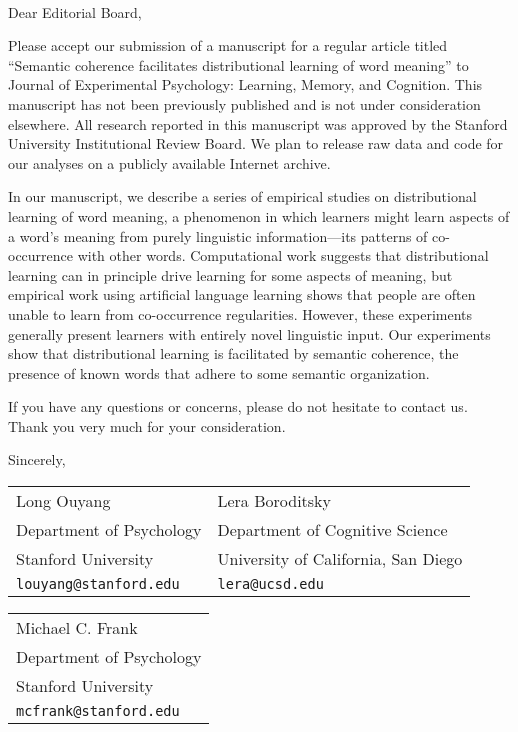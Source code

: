 \documentclass{letter}
\begin{document}
\address{450 Serra Mall \\ Building 420 (Jordan Hall) \\ Stanford, CA~~94305}


\pagestyle{empty}
\begin{letter}{~~~}
\opening{Dear Editorial Board,}

Please accept our submission of a manuscript for a regular article titled ``Semantic coherence facilitates distributional learning of word meaning'' to Journal of Experimental Psychology: Learning, Memory, and Cognition. This manuscript has not been previously published and is not under consideration elsewhere. All research reported in this manuscript was approved by the Stanford University Institutional Review Board. We plan to release raw data and code for our analyses on a publicly available Internet archive.

In our manuscript, we describe a series of empirical studies on distributional learning of word meaning, a phenomenon in which learners might learn aspects of a word's meaning from purely linguistic information---its patterns of co-occurrence with other words. Computational work suggests that distributional learning can in principle drive learning for some aspects of meaning, but empirical work using artificial language learning shows that people are often unable to learn from co-occurrence regularities. However, these experiments generally present learners with entirely novel linguistic input. Our experiments show that distributional learning is facilitated by semantic coherence, the presence of known words that adhere to some semantic organization.



If you have any questions or concerns, please do not hesitate to contact us. Thank you very much for your consideration.


\vspace{2\parskip}
Sincerely,\\

\begin{tabularx}{\textwidth}{X l}
Long Ouyang & Lera Boroditsky\\
Department of Psychology & Department of Cognitive Science\\
Stanford University & University of California, San Diego\\
\texttt{louyang@stanford.edu} & \texttt{lera@ucsd.edu}\\
\end{tabularx}

\begin{tabular}{l}
Michael C. Frank\\
Department of Psychology\\
Stanford University\\
\texttt{mcfrank@stanford.edu}
\end{tabular}

\end{letter}
\end{document}
